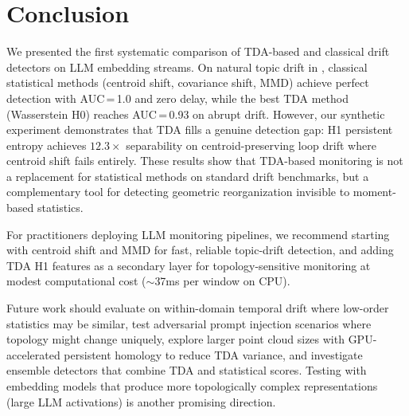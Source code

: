\section{Conclusion}
\label{sec:conclusion}

We presented the first systematic comparison of TDA-based and classical drift detectors on LLM embedding streams. On natural topic drift in \agnews, classical statistical methods (centroid shift, covariance shift, MMD) achieve perfect detection with AUC\,=\,1.0 and zero delay, while the best TDA method (Wasserstein H0) reaches AUC\,=\,0.93 on abrupt drift. However, our synthetic experiment demonstrates that TDA fills a genuine detection gap: H1 persistent entropy achieves $12.3\times$ separability on centroid-preserving loop drift where centroid shift fails entirely. These results show that TDA-based monitoring is not a replacement for statistical methods on standard drift benchmarks, but a complementary tool for detecting geometric reorganization invisible to moment-based statistics.

For practitioners deploying LLM monitoring pipelines, we recommend starting with centroid shift and MMD for fast, reliable topic-drift detection, and adding TDA H1 features as a secondary layer for topology-sensitive monitoring at modest computational cost ($\sim$37ms per window on CPU).

Future work should evaluate on within-domain temporal drift where low-order statistics may be similar, test adversarial prompt injection scenarios where topology might change uniquely, explore larger point cloud sizes with GPU-accelerated persistent homology to reduce TDA variance, and investigate ensemble detectors that combine TDA and statistical scores. Testing with embedding models that produce more topologically complex representations (\eg large LLM activations) is another promising direction.
